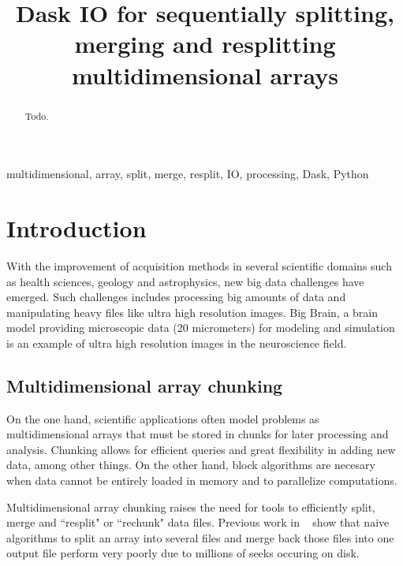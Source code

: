 \documentclass[conference]{IEEEtran}
\begin{document}
\title{ Dask IO for sequentially splitting, merging and resplitting multidimensional arrays }

\author{
}

\maketitle

\begin{abstract}
Todo.
\end{abstract}

\begin{IEEEkeywords}
multidimensional, array, split, merge, resplit, IO, processing, Dask, Python
\end{IEEEkeywords}

\section{Introduction}
With the improvement of acquisition methods in several scientific domains such as
health sciences, geology and astrophysics, new big data challenges have emerged.
Such challenges includes processing big amounts of data and manipulating heavy
files like ultra high resolution images. Big Brain, a brain model providing
microscopic data (20 micrometers) for modeling and simulation~\cite{Amunts1472}
is an example of ultra high resolution images in the neuroscience field.

\subsection{Multidimensional array chunking}
On the one hand, scientific applications often model problems as multidimensional
arrays that must be stored in chunks for later processing and analysis. Chunking
allows for efficient queries and great flexibility in adding new data, among
other things. On the other hand, block algorithms are necesary when data cannot
be entirely loaded in memory and to parallelize computations.

Multidimensional array chunking raises the need for tools to efficiently split,
merge and ``resplit" or ``rechunk" data files. Previous work in ~\cite{seqalgorithms}
show that naive algorithms to split an array into several files and merge back
those files into one output file perform very poorly due to millions of seeks
occuring on disk.
\end{document}

